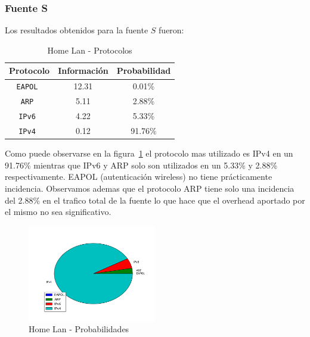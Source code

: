 \documentclass[final,inline,narroweqnarray,a4paper]{ieee}
\begin{document}
\subsubsection{Fuente S}

Los resultados obtenidos para la fuente $S$ fueron:

\begin{table}[H]
    \begin{center}
        \begin{tabular}{|c|c|c|}
            \hline
            \textbf{Protocolo} & \textbf{Información} & \textbf{Probabilidad} \\ \hline
            \texttt{EAPOL     }& 12.31       & 0.01\%     \\ \hline
            \texttt{ARP       }& 5.11        & 2.88\%     \\ \hline
            \texttt{IPv6      }& 4.22        & 5.33\%     \\ \hline
            \texttt{IPv4      }& 0.12        & 91.76\%    \\ \hline
        \end{tabular}
        \caption{Home Lan - Protocolos}
        \label{table:homelanS}
    \end{center}
\end{table}

Como puede observarse en la figura~\ref{torta:homelanS} el protocolo mas utilizado es IPv4 en un 91.76\% mientras que IPv6 y ARP solo son utilizados en un 5.33\% y 2.88\% respectivamente. EAPOL (autenticación wireless) no tiene prácticamente incidencia.
Observamos ademas que el protocolo ARP tiene solo una incidencia del 2.88\% en el trafico total de la fuente lo que hace que el overhead aportado por el mismo no sea significativo. 

\begin{figure}[H]
    \begin{center}
        \includegraphics[width=0.5\textwidth]{plot/homelanS-pie.png}
        \caption{Home Lan - Probabilidades}
        \label{torta:homelanS}
    \end{center}
\end{figure}
\end{document}
